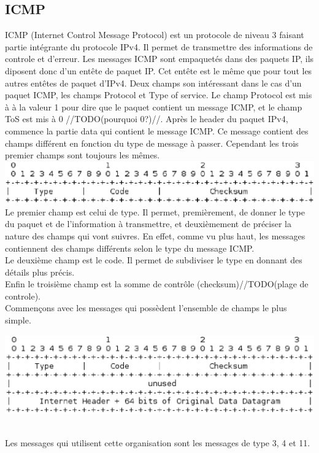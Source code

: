 \documentclass[twoside,openright,a4paper,11pt,french]{article}
\begin{document}
\subsection{ICMP}
ICMP (Internet Control Message Protocol) est un protocole de niveau 3 faisant partie intégrante du protocole IPv4. Il permet de transmettre des informations de controle et d'erreur. Les messages ICMP sont empaquetés dans des paquets IP, ils diposent donc d'un entête de paquet IP. Cet entête est le même que pour tout les autres entêtes de paquet d'IPv4. Deux champs son intéressant dans le cas d'un paquet ICMP, les champs Protocol et Type of service. Le champ Protocol est mis à à la valeur 1 pour dire que le paquet contient un message ICMP, et le champ ToS est mis à 0 //TODO(pourquoi 0?)//.
Après le header du paquet IPv4, commence la partie data qui contient le message ICMP. Ce message contient des champs différent en fonction du type de message à passer. Cependant les trois premier champs sont toujours les mêmes.
\includegraphics[width=15cm]{./pics/header.eps}
\\Le premier champ est celui de type. Il permet, premièrement, de donner le type du paquet et de l'information à transmettre, et deuxièmement de préciser la nature des champs qui vont suivres. En effet, comme vu plus haut, les messages contiennent des champs différents selon le type du message ICMP.
\\Le deuxième champ est le code. Il permet de subdiviser le type en donnant des détails plus précis.
\\Enfin le troisième champ est la somme de contrôle (checksum)//TODO(plage de controle).
\\Commençons avec les messages qui possèdent l'ensemble de champs le plus simple.

\includegraphics[width=15cm]{./pics/header1.eps}

\\Les messages qui utilisent cette organisation sont les messages de type 3, 4 et 11.
\end{document}
